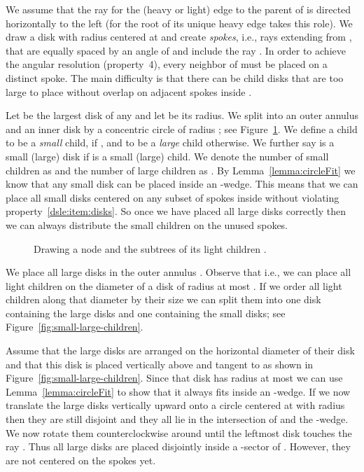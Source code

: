 \documentclass[11pt]{article}
\newenvironment{proof}{\noindent{\bf Proof:}}{\bigskip} \makeatletter
\newcommand{\highlight}[1]{{\itshape #1}}
\begin{document}
\begin{proof}
  We assume that the ray  for the (heavy or light) edge to the parent of  is directed
  horizontally to the left (for the root of  its unique heavy edge takes this role). We draw a disk  with radius 
  centered at  and create  \highlight{spokes}, i.e., rays
  extending from , that are equally
  spaced by an angle of  and include the ray . In order to achieve the angular resolution (property~4), every neighbor of 
  must be placed on a distinct spoke. The main difficulty is that there can be child disks
  that are too large to place without overlap on adjacent spokes
  inside .

  Let  be the largest disk  of any  and let
   be its radius. We split  into an outer annulus  and
  an inner disk  by a concentric circle of radius ; see Figure~\ref{fig:light-straight}. We define a child
   to be a \highlight{small} child, if  , and to be a
  \highlight{large} child otherwise. We further say  is a small
  (large) disk if  is a small (large) child.  We denote the number
  of small children as  and the number of large children as
  .  By Lemma~\ref{lemma:circleFit} we know that any small disk
   can be placed inside an -wedge. This means that
  we can place all  small disks centered on any subset of  spokes
  inside  without violating property~\ref{dsle:item:disks}. So once we
  have placed all large disks correctly then we can always distribute
  the small children on the unused spokes.

  \begin{figure}[tb]
    \centering
    \hfill
    \caption{Drawing a node  and the subtrees of its light children .}
    \label{fig:light-straight}
  \end{figure}

  We place all large disks in the outer annulus . Observe
  that  i.e., we can place all light children on the diameter
  of a disk of radius at most . If we order all light children
  along that diameter by their size we can split them into one disk
  containing the large disks and one containing the small disks;
  see Figure~\ref{fig:small-large-children}.
  
  Assume that the large disks are arranged on the horizontal diameter
  of their disk and that this disk is placed vertically above  and
  tangent to  as shown in
  Figure~\ref{fig:small-large-children}. Since that disk has radius at
  most  we can use Lemma~\ref{lemma:circleFit} to show that it
  always fits inside an -wedge. If we now translate the
  large disks vertically upward onto a circle centered at  with
  radius  then they are still disjoint and they all
  lie in the intersection of  and the -wedge. We now
  rotate them counterclockwise around  until the leftmost disk
   touches the ray . Thus all large disks
  are placed disjointly inside a -sector of . However, they
  are not centered on the spokes yet.


\end{proof}
\end{document}

